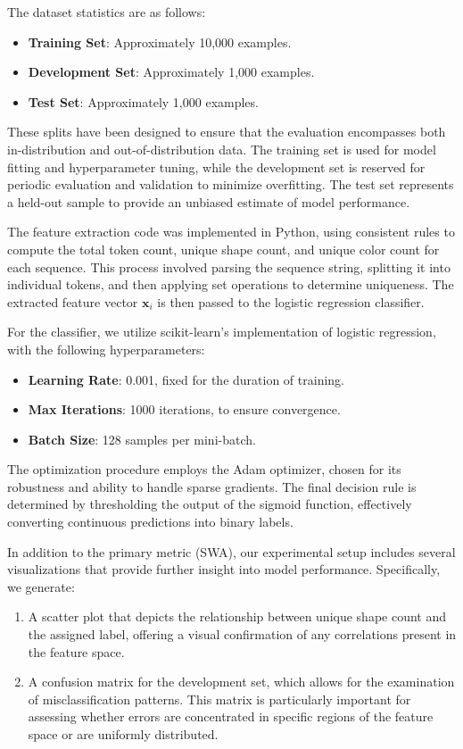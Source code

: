 \documentclass{article}
\begin{document}
The dataset statistics are as follows:
\begin{itemize}
    \item \textbf{Training Set}: Approximately 10,000 examples.
    \item \textbf{Development Set}: Approximately 1,000 examples.
    \item \textbf{Test Set}: Approximately 1,000 examples.
\end{itemize}

These splits have been designed to ensure that the evaluation encompasses both in-distribution and out-of-distribution data. The training set is used for model fitting and hyperparameter tuning, while the development set is reserved for periodic evaluation and validation to minimize overfitting. The test set represents a held-out sample to provide an unbiased estimate of model performance.

The feature extraction code was implemented in Python, using consistent rules to compute the total token count, unique shape count, and unique color count for each sequence. This process involved parsing the sequence string, splitting it into individual tokens, and then applying set operations to determine uniqueness. The extracted feature vector \(\mathbf{x}_i\) is then passed to the logistic regression classifier.

For the classifier, we utilize scikit-learn's implementation of logistic regression, with the following hyperparameters:
\begin{itemize}
    \item \textbf{Learning Rate}: 0.001, fixed for the duration of training.
    \item \textbf{Max Iterations}: 1000 iterations, to ensure convergence.
    \item \textbf{Batch Size}: 128 samples per mini-batch.
\end{itemize}

The optimization procedure employs the Adam optimizer, chosen for its robustness and ability to handle sparse gradients. The final decision rule is determined by thresholding the output of the sigmoid function, effectively converting continuous predictions into binary labels.

In addition to the primary metric (SWA), our experimental setup includes several visualizations that provide further insight into model performance. Specifically, we generate:
\begin{enumerate}
    \item A scatter plot that depicts the relationship between unique shape count and the assigned label, offering a visual confirmation of any correlations present in the feature space.
    \item A confusion matrix for the development set, which allows for the examination of misclassification patterns. This matrix is particularly important for assessing whether errors are concentrated in specific regions of the feature space or are uniformly distributed.
\end{enumerate}
\end{document}
